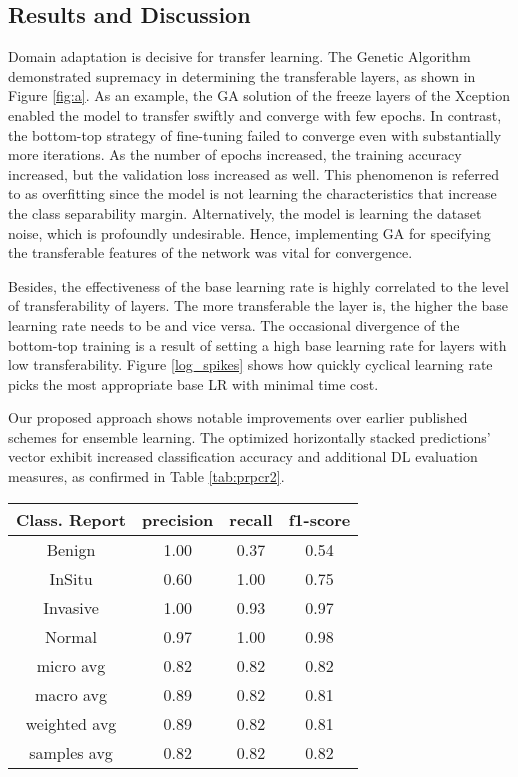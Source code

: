 \documentclass[a4paper, 12 pt, conference]{ieeeconf}
\begin{document}
\subsection{Results and Discussion}
\quad Domain adaptation is decisive for transfer learning. The Genetic Algorithm demonstrated supremacy in determining the transferable layers, as shown in Figure \ref{fig:a}.  As an example, the GA solution of the freeze layers of the Xception enabled the model to transfer swiftly and converge with few epochs. In contrast, the bottom-top strategy of fine-tuning failed to converge even with substantially more iterations. As the number of epochs increased, the training accuracy increased, but the validation loss increased as well. This phenomenon is referred to as overfitting since the model is not learning the characteristics that increase the class separability margin. Alternatively, the model is learning the dataset noise, which is profoundly undesirable. Hence, implementing GA for specifying the transferable features of the network was vital for convergence.

\quad Besides, the effectiveness of the base learning rate is highly correlated to the level of transferability of layers. The more transferable the layer is, the higher the base learning rate needs to be and vice versa. The occasional divergence of the bottom-top training is a result of setting a high base learning rate for layers with low transferability.
Figure \ref{log_spikes} shows how quickly cyclical learning rate picks the most appropriate base LR with minimal time cost.

\quad Our proposed approach shows notable improvements over earlier published schemes for ensemble learning. The optimized horizontally stacked predictions' vector exhibit increased classification accuracy and additional DL evaluation measures, as confirmed in Table \ref{tab:prpcr2}.

\vspace{\baselineskip}
\begin{minipage}[htbp]{\linewidth}
\centering
{} \label{tab:maxcr}
\begin{tabular}{|c|c|c|c|} \toprule[0.8pt]
\hline
{Class. Report} & precision & recall & f1-score \\
\hline
Benign & 1.00  & 0.37 & 0.54 \\
\hline
InSitu & 0.60 & 1.00 & 0.75 \\
\hline
Invasive & 1.00 & 0.93 & 0.97 \\
\hline
Normal & 0.97 & 1.00 & 0.98 \\
\hline
micro avg & 0.82 & 0.82 & 0.82 \\
\hline
macro avg & 0.89 & 0.82 & 0.81 \\
\hline
weighted avg & 0.89 & 0.82 & 0.81 \\
\hline
 samples avg  & 0.82 & 0.82 & 0.82 \\
\hline
\bottomrule[0.8pt]
\end{tabular}
\end{minipage}
\vspace{\baselineskip}
\end{document}

